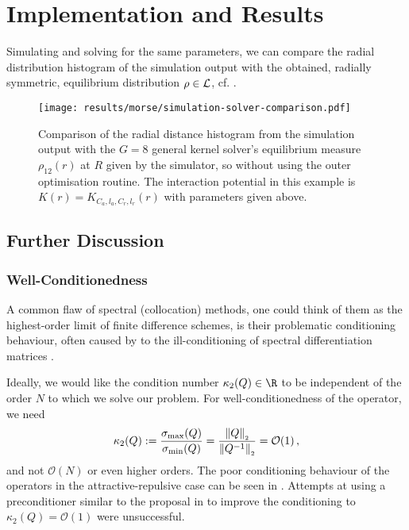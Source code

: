 \chapter{Implementation and Results}
\label{chap:implementation-and-results}

Simulating and solving for the same parameters, we can compare the radial distribution histogram of the simulation output with the obtained, radially symmetric, equilibrium distribution $\rho \in \mathcal{L}$, cf. .


\begin{figure}[H]
  \centering
  \texttt{[image: results/morse/simulation-solver-comparison.pdf]}
  \caption[Comparison of histogram and spectral method solution]{Comparison of the radial distance histogram from the simulation output with the $G = 8$ general kernel solver's equilibrium measure $\rho_{12}(r)$ at $R$ given by the simulator, so without using the outer optimisation routine. The interaction potential in this example is $K(r) = K_{C_a, l_a, C_r, l_r}(r)$ with parameters given above.}
  \label{fig:simulation-solver-comparison}
\end{figure}

\section{Further Discussion}
\subsection{Well-Conditionedness}
A common flaw of spectral (collocation) methods, one could think of them as the highest-order limit of finite difference schemes, is their problematic conditioning behaviour, often caused by to the ill-conditioning of spectral differentiation matrices \parencite{2019-atap}.

Ideally, we would like the condition number $\kappa_2(Q) \in \R$ to be independent of the order $N$ to which we solve our problem.
For well-conditionedness of the operator, we need
$$\kappa_2(Q) := \frac{\sigma_{\rm max}(Q)}{\sigma_{\rm min}(Q)} = \frac{\left\lVert Q\right\rVert_{\scriptscriptstyle 2}}{\left\lVert Q^{-1}\right\rVert_{\scriptscriptstyle 2}} = \mathcal{O}(1)\,,$$
and not $\mathcal{O}(N)$ or even higher orders.
The poor conditioning behaviour of the operators in the attractive-repulsive case can be seen in .
Attempts at using a preconditioner similar to the proposal in \cite{2013-a-fast-and-well-conditioned-spectral-method} to improve the conditioning to $\kappa_2(Q) = \mathcal{O}(1)$ were unsuccessful.

